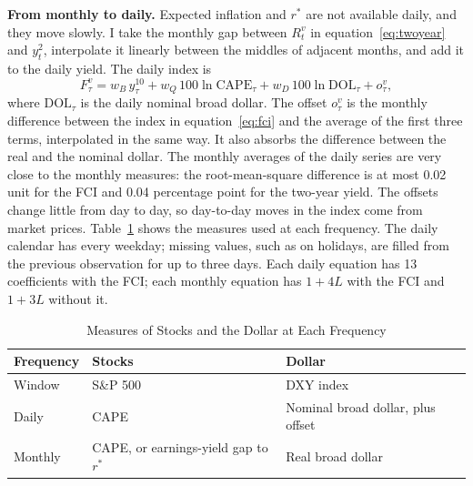\documentclass[11pt]{article}
\newcommand{\rs}{r^{*}}
\begin{document}
\begin{appendices}
\textbf{From monthly to daily.} Expected inflation and $\rs$ are not available daily, and they move slowly. I take the monthly gap between $R_t^{v}$ in equation~\eqref{eq:twoyear} and $y^{2}_t$, interpolate it linearly between the middles of adjacent months, and add it to the daily yield. The daily index is
\begin{equation}
F_\tau^{v} = w_B\, y^{10}_\tau + w_Q\, 100\ln\text{CAPE}_\tau + w_D\, 100\ln\text{DOL}_\tau + o_\tau^{v}, \label{eq:dailyfci}
\end{equation}
where $\text{DOL}_\tau$ is the daily nominal broad dollar. The offset $o_\tau^{v}$ is the monthly difference between the index in equation~\eqref{eq:fci} and the average of the first three terms, interpolated in the same way. It also absorbs the difference between the real and the nominal dollar. The monthly averages of the daily series are very close to the monthly measures: the root-mean-square difference is at most 0.02 unit for the FCI and 0.04 percentage point for the two-year yield. The offsets change little from day to day, so day-to-day moves in the index come from market prices. Table~\ref{tab:measures} shows the measures used at each frequency. The daily calendar has every weekday; missing values, such as on holidays, are filled from the previous observation for up to three days. Each daily equation has 13 coefficients with the FCI; each monthly equation has $1+4L$ with the FCI and $1+3L$ without it.

\begin{table}[tp]\centering\small
\caption{Measures of Stocks and the Dollar at Each Frequency}\label{tab:measures}
\begin{tabular}{lll}\toprule
Frequency & Stocks & Dollar \\\midrule
Window & S\&P 500 & DXY index \\
Daily & CAPE & Nominal broad dollar, plus offset \\
Monthly & CAPE, or earnings-yield gap to $\rs$ & Real broad dollar \\\bottomrule
\end{tabular}
\end{table}


\end{appendices}
\end{document}
